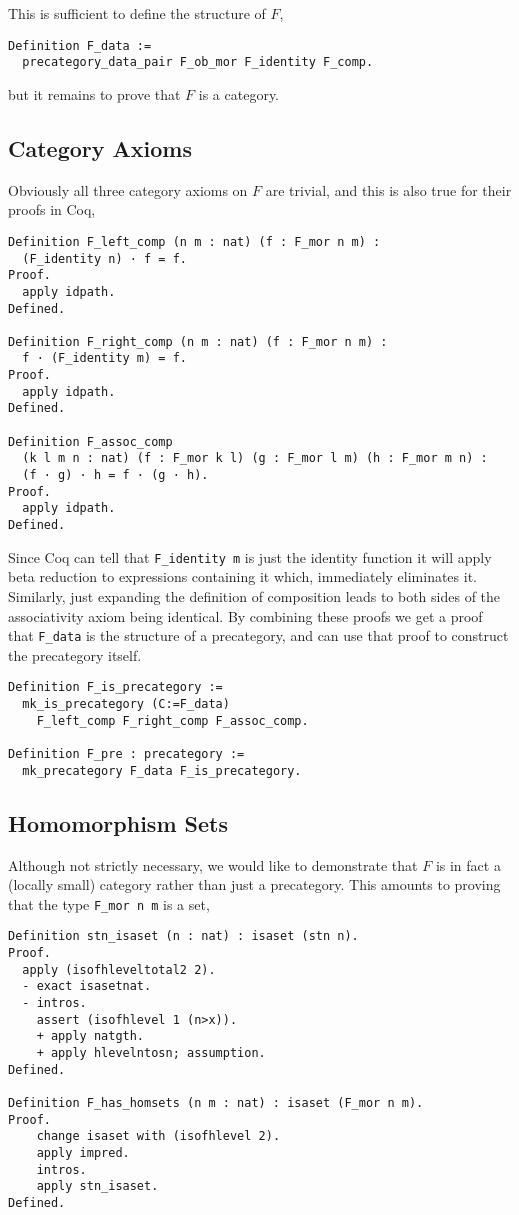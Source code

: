 This is sufficient to define the structure of $F$,
\begin{lstlisting}
Definition F_data := 
  precategory_data_pair F_ob_mor F_identity F_comp.
\end{lstlisting}
but it remains to prove that $F$ is a category.

\subsection{Category Axioms}
Obviously all three category axioms on $F$ are trivial, and this is also true
for their proofs in Coq,
\begin{lstlisting}
Definition F_left_comp (n m : nat) (f : F_mor n m) : 
  (F_identity n) · f = f.
Proof.
  apply idpath.
Defined.

Definition F_right_comp (n m : nat) (f : F_mor n m) : 
  f · (F_identity m) = f.
Proof.
  apply idpath.
Defined.

Definition F_assoc_comp 
  (k l m n : nat) (f : F_mor k l) (g : F_mor l m) (h : F_mor m n) :
  (f · g) · h = f · (g · h).
Proof.
  apply idpath.
Defined.
\end{lstlisting}

Since Coq can tell that \lstinline|F_identity m| is just the identity function it
will apply beta reduction to expressions containing it which, immediately
eliminates it. Similarly, just expanding the definition of composition leads to
both sides of the associativity axiom being identical. By combining these proofs
we get a proof that \lstinline|F_data| is the structure of a precategory, and can
use that proof to construct the precategory itself.

\begin{lstlisting}
Definition F_is_precategory := 
  mk_is_precategory (C:=F_data) 
    F_left_comp F_right_comp F_assoc_comp.

Definition F_pre : precategory := 
  mk_precategory F_data F_is_precategory.
\end{lstlisting}

\subsection{Homomorphism Sets}
Although not strictly necessary, we would like to demonstrate that $F$ is in
fact a (locally small) category rather than just a precategory. This amounts to
proving that the type \lstinline|F_mor n m| is a set,

\begin{lstlisting}
Definition stn_isaset (n : nat) : isaset (stn n).
Proof.
  apply (isofhleveltotal2 2).
  - exact isasetnat.
  - intros.
    assert (isofhlevel 1 (n>x)).
    + apply natgth.
    + apply hlevelntosn; assumption.
Defined.

Definition F_has_homsets (n m : nat) : isaset (F_mor n m).
Proof.
    change isaset with (isofhlevel 2).
    apply impred.
    intros.
    apply stn_isaset.
Defined.
\end{lstlisting}

